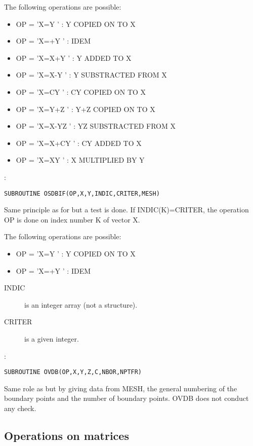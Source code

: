 The following operations are possible:
\begin{itemize}
  \item OP = 'X=Y     ' : Y COPIED ON TO X
  \item OP = 'X=+Y    ' : IDEM
  \item OP = 'X=X+Y   ' : Y ADDED TO X
  \item OP = 'X=X-Y   ' : Y SUBSTRACTED FROM X
  \item OP = 'X=CY    ' : CY COPIED ON TO X
  \item OP = 'X=Y+Z   ' : Y+Z COPIED ON TO X
  \item OP = 'X=X-YZ  ' : YZ SUBSTRACTED FROM X
  \item OP = 'X=X+CY  ' : CY ADDED TO X
  \item OP = 'X=XY    ' : X MULTIPLIED BY Y
\end{itemize}

:
\begin{lstlisting}[language=TelFortran]
SUBROUTINE OSDBIF(OP,X,Y,INDIC,CRITER,MESH)
\end{lstlisting}

Same principle as for  but a test is done. If INDIC(K)=CRITER, the
operation OP is done on index number K of vector X.

The following operations are possible:
\begin{itemize}
  \item OP = 'X=Y     ' : Y COPIED ON TO X
  \item OP = 'X=+Y    ' : IDEM
\end{itemize}

\begin{description}
\item [INDIC] is an integer array (not a structure).
\item [CRITER] is a given integer.
\end{description}

:
\begin{lstlisting}[language=TelFortran]
SUBROUTINE OVDB(OP,X,Y,Z,C,NBOR,NPTFR)
\end{lstlisting}

Same role as  but by giving data from MESH, the general numbering of the
boundary points and the number of boundary points. OVDB does not conduct any
check.

\subsection{Operations on matrices}

